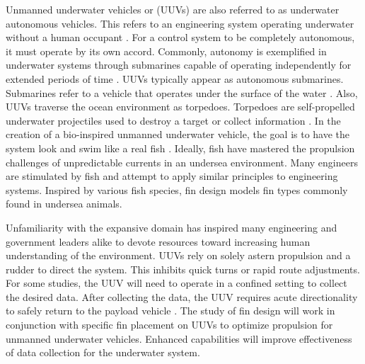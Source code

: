 \documentclass{IEEEtran}
\begin{document}
Unmanned underwater vehicles or (UUVs) are also referred to as underwater autonomous vehicles.  This refers to an engineering system operating underwater without a human occupant \cite{greenemeier2011bloom}.  For a control system to be completely autonomous, it must operate by its own accord.  Commonly, autonomy is exemplified in underwater systems through submarines capable of operating independently for extended periods of time \cite{davenport2016drone}.  UUVs typically appear as autonomous submarines.  Submarines refer to a vehicle that operates under the surface of the water \cite{davenport2016drone}.  Also, UUVs traverse the ocean environment as torpedoes.  Torpedoes are self-propelled underwater projectiles used to destroy a target or collect information \cite{greenemeier2011bloom}.  In the creation of a bio-inspired unmanned underwater vehicle, the goal is to have the system look and swim like a real fish \cite{frizell2014navy}.  Ideally, fish have mastered the propulsion challenges of unpredictable currents in an undersea environment.  Many engineers are stimulated by fish and attempt to apply similar principles to engineering systems.  Inspired by various fish species, fin design models fin types commonly found in undersea animals.  

Unfamiliarity with the expansive domain has inspired many engineering and government leaders alike to devote resources toward increasing human understanding of the environment.  UUVs rely on solely astern propulsion and a rudder to direct the system.  This inhibits quick turns or rapid route adjustments.  For some studies, the UUV will need to operate in a confined setting to collect the desired data.  After collecting the data, the UUV requires acute directionality to safely return to the payload vehicle \cite{davenport2016drone}.  The study of fin design will work in conjunction with specific fin placement on UUVs to optimize propulsion for unmanned underwater vehicles.  Enhanced capabilities will improve effectiveness of data collection for the underwater system.  
   
\end{document}
